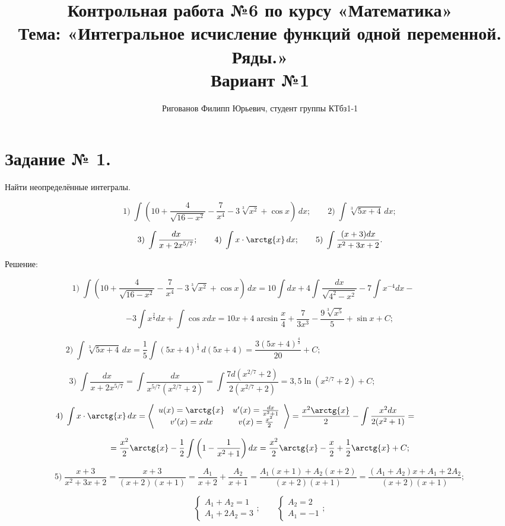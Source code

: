 \documentclass{article}
\title{Контрольная работа №6 по курсу «Математика»\\
Тема: «Интегральное исчисление функций одной переменной. Ряды.»\\
Вариант №1}
\author{Ригованов Филипп Юрьевич, студент группы КТбз1-1}
\begin{document}
\date{}
\maketitle
\section*{Задание № 1.}

Найти неопределённые интегралы.

$$1)\;\int\left(10+\frac{4}{\sqrt{16-x^2}}-\frac{7}{x^4}-3\sqrt[3]{x^2}+\cos{x}\right)\,dx;\qquad2)\;\int\sqrt[3]{5x+4}\,dx;$$

$$3)\;\int\frac{dx}{x+2x^{5/7}};\qquad4)\;\int x\cdot\arctg{x}\,dx;\qquad5)\;\int\frac{(x+3)dx}{x^2+3x+2}.$$

\begin{center}Решение:\end{center}

$$1)\;\int\left(10+\frac{4}{\sqrt{16-x^2}}-\frac{7}{x^4}-3\sqrt[3]{x^2}+\cos{x}\right)\,dx=10\int{dx}+4\int\frac{dx}{\sqrt{4^2-x^2}}-7\int{x^{-4}}dx-\qquad\qquad$$

$$-3\int{x^{\frac{2}{3}}}dx+\int\cos{x}dx=10x+4\arcsin{\frac{x}{4}}+\frac{7}{3x^3}-\frac{9\sqrt[3]{x^5}}{5}+\sin{x}+C;$$

$$2)\;\int\sqrt[3]{5x+4}\,dx=\frac{1}{5}\int(5x+4)^{\frac{1}{3}}\,d(5x+4)=\frac{3(5x+4)^{\frac{4}{3}}}{20}+C;\qquad\qquad\qquad\qquad\qquad\qquad\qquad\qquad$$

$$3)\;\int\frac{dx}{x+2x^{5/7}}=\int\frac{dx}{x^{5/7}(x^{2/7}+2)}=\int\frac{7d(x^{2/7}+2)}{2(x^{2/7}+2)}=3,5\ln{(x^{2/7}+2)}+C;\qquad\qquad\qquad\qquad\quad$$

$$4)\;\int x\cdot\arctg{x}\,dx=\left\langle \begin{array}{cc} u(x)=\arctg{x} & u^\prime(x)=\frac{dx}{x^2+1} \\ v^\prime(x)=xdx & v(x)=\frac{x^2}{2} \end{array} \right\rangle=\frac{x^2\arctg{x}}{2}-\int \frac{x^2dx}{2(x^2+1)}=\qquad\qquad\qquad$$

$$=\frac{x^2}{2}\arctg{x}-\frac{1}{2}\int \left(1-\frac{1}{x^2+1}\right)dx=\frac{x^2}{2}\arctg{x}-\frac{x}{2}+\frac{1}{2}\arctg{x}+C;$$

$$5)\;\frac{x+3}{x^2+3x+2}=\frac{x+3}{(x+2)(x+1)}=\frac{A_1}{x+2}+\frac{A_2}{x+1}=\frac{A_1(x+1)+A_2(x+2)}{(x+2)(x+1)}=\frac{(A_1+A_2)x+A_1+2A_2}{(x+2)(x+1)};$$

$$
 \begin{cases}
   A_1+A_2 = 1\\
   A_1+2A_2 = 3
 \end{cases};\qquad
 \begin{cases}
   A_2 = 2\\
   A_1 = -1
 \end{cases};
$$
\end{document}
